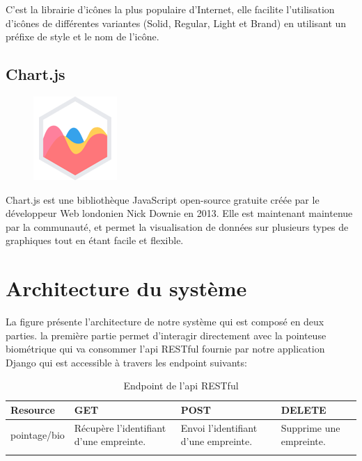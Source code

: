 C’est la librairie d'icônes la plus populaire d'Internet, elle facilite
l’utilisation  d’icônes de différentes variantes (Solid, Regular, Light et
Brand) en utilisant un préfixe de style et le nom de l'icône\cite{28}.

\subsection{Chart.js}
\begin{figure}
    \vspace{-22pt}
    \begin{center}
        \includegraphics[scale=0.36]{images/logo/chartjs.png}
        \label{fig83}
    \end{center}
    \vspace{-20pt}
    \vspace{-10pt}
\end{figure}

Chart.js est une bibliothèque JavaScript open-source gratuite créée par le 
développeur Web londonien Nick Downie en 2013. Elle est maintenant maintenue par 
la communauté, et permet la visualisation de données sur plusieurs types de 
graphiques tout en étant facile et flexible\cite{29}.

\section{Architecture du système} 
La figure présente l’architecture de notre système qui est composé en deux
parties. la première partie permet d’interagir directement avec la pointeuse
biométrique qui va consommer l’api RESTful fournie par notre application Django
qui est accessible à travers les endpoint suivants:

\begin{longtable}{|p{2.5cm}|p{4.5cm}|p{4.5cm}|p{4.5cm}|}
    \endhead
    \endfoot
    \hline
    Resource & GET & POST & DELETE \\
    \hline
    pointage/bio & Récupère l'identifiant d'une empreinte. & Envoi l'identifiant
    d'une empreinte. & Supprime une empreinte.
    \\
    \hline
    \caption{Endpoint de l'api RESTful}\\
\end{longtable}

